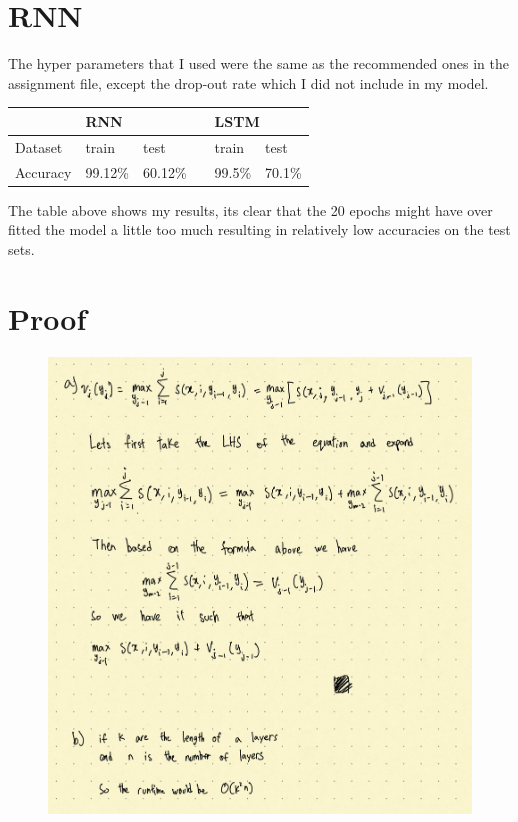 \documentclass[12pt]{article}
\begin{document}
\section{RNN}
The hyper parameters that I used were the same as the recommended ones in the assignment file, except the drop-out rate which I did not include in my model.
\begin{table}[!h]
\centering
\begin{tabular}{|l|ll|l|ll|}
\hline
         & \multicolumn{2}{l|}{RNN}               &  & \multicolumn{2}{l|}{LSTM}            \\ \hline
Dataset  & \multicolumn{1}{l|}{train}   & test    &  & \multicolumn{1}{l|}{train}  & test   \\ \hline
Accuracy & \multicolumn{1}{l|}{99.12\%} & 60.12\% &  & \multicolumn{1}{l|}{99.5\%} & 70.1\% \\ \hline
\end{tabular}
\end{table}
The table above shows my results, its clear that the 20 epochs might have over fitted the model a little too much resulting in relatively low accuracies on the test sets.
\section{Proof}
\begin{figure}[h!]
	\includegraphics[scale=0.2]{2.png}
\end{figure}
\newpage
\end{document}
